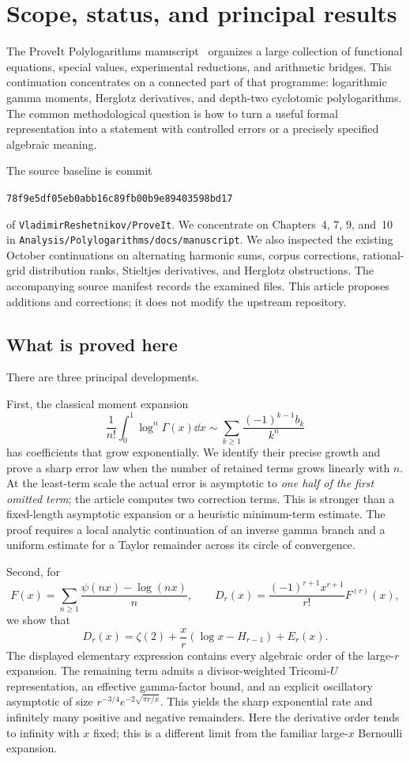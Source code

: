 \section{Scope, status, and principal results}
\label{sec:introduction}

The ProveIt Polylogarithms manuscript~\cite{ProveIt} organizes a large collection of
functional equations, special values, experimental reductions, and
arithmetic bridges. This continuation concentrates on a connected part
of that programme: logarithmic gamma moments, Herglotz derivatives, and
depth-two cyclotomic polylogarithms. The common methodological question is
how to turn a useful formal representation into a statement with
controlled errors or a precisely specified algebraic meaning.

The source baseline is commit
\begin{center}\small
\texttt{78f9e5df05eb0abb16c89fb00b9e89403598bd17}
\end{center}
of \nolinkurl{VladimirReshetnikov/ProveIt}. We concentrate on Chapters~4, 7, 9,
and~10 in \nolinkurl{Analysis/Polylogarithms/docs/manuscript}.
We also inspected the existing October continuations on alternating
harmonic sums, corpus corrections, rational-grid distribution ranks,
Stieltjes derivatives, and Herglotz obstructions. The accompanying source
manifest records the examined files. This article proposes additions and
corrections; it does not modify the upstream repository.

\subsection{What is proved here}

There are three principal developments.

First, the classical moment expansion
\[
 \frac1{n!}\int_0^1\log^n\Gamma(x)\dd x
 \sim\sum_{k\geq1}\frac{(-1)^{k-1}b_k}{k^n}
\]
has coefficients that grow exponentially. We identify their precise
growth and prove a sharp error law when the number of retained terms
grows linearly with \(n\). At the least-term scale the actual error is
asymptotic to \emph{one half of the first omitted term}; the article
computes two correction terms. This is stronger than a fixed-length
asymptotic expansion or a heuristic minimum-term estimate. The proof
requires a local analytic continuation of an inverse gamma branch and a
uniform estimate for a Taylor remainder across its circle of convergence.

Second, for
\[
 F(x)=\sum_{n\geq1}\frac{\psi(nx)-\log(nx)}n,\qquad
 D_r(x)=\frac{(-1)^{r+1}x^{r+1}}{r!}F^{(r)}(x),
\]
we show that
\[
 D_r(x)=\zeta(2)+\frac xr(\log x-H_{r-1})+E_r(x).
\]
The displayed elementary expression contains every algebraic order of
the large-\(r\) expansion. The remaining term admits a divisor-weighted
Tricomi-\(U\) representation, an effective gamma-factor bound, and an
explicit oscillatory asymptotic of size
\(r^{-3/4}e^{-2\sqrt{\pi r/x}}\). This yields the sharp exponential rate
and infinitely many positive and negative remainders. Here the derivative
order tends to infinity with \(x\) fixed; this is a different limit from
the familiar large-\(x\) Bernoulli expansion.

